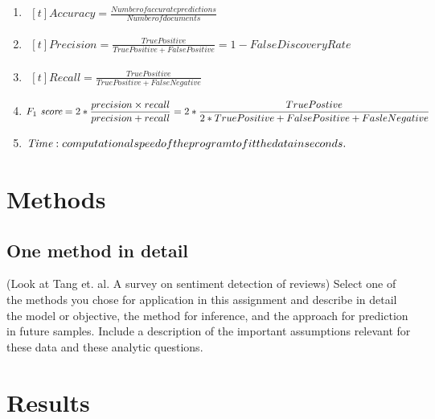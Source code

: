 \documentclass{article} %
\begin{document}
\begin{enumerate}
\item $\begin{aligned}[t]
    {Accuracy} = \frac{Number of accurate predictions}{Number of documents}
\end{aligned}$
\item $\begin{aligned}[t]
    {Precision} = \frac {True Positive}{True Positive+False Positive} = 1 - False Discovery Rate
\end{aligned}$
\item $\begin{aligned}[t]
    {Recall} = \frac {TruePositive}{TruePositive+FalseNegative}
\end{aligned}$
\item $\begin{aligned}[t]
   \emph{$F_1$ score}=  2 *\frac {precision \times recall} {precision + recall} = 2 *\frac{TruePostive}{2*TruePositive+FalsePositive+FasleNegative}
\end{aligned}$
\item $\begin{aligned}[t]
   \emph{Time} : computational speed of the program to fit the data in seconds.
\end{aligned}$
\end{enumerate}

\section{Methods}

\subsection{One method in detail}
(Look at Tang et. al. A survey on sentiment detection of reviews)
Select one of the methods you chose for application in this assignment and describe in detail the model or objective, the method for inference, and the approach for prediction in future samples. Include a description of the important assumptions relevant for these data and these analytic questions.

\section{Results}
\end{document}
